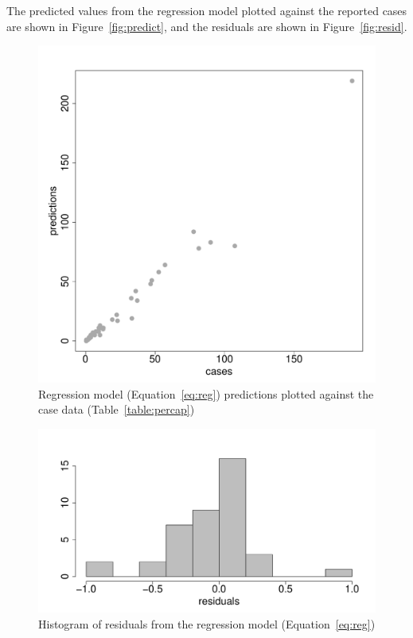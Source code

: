 \documentclass{article}
\begin{document}
The predicted values from the regression model plotted against the reported cases are shown in Figure~\autoref{fig:predict}, and the residuals are shown in Figure~\autoref{fig:resid}.
\begin{figure}
\begin{center}
\includegraphics{draftfinalreport-015}
\end{center}
\caption{Regression model (Equation~\autoref{eq:reg}) predictions plotted against the case data (Table~\autoref{table:percap})}
\label{fig:predict}
\end{figure}


\begin{figure}
\begin{center}
\includegraphics{draftfinalreport-017}
\end{center}
\caption{Histogram of residuals from the regression model (Equation~\autoref{eq:reg})}
\label{fig:resid}
\end{figure}
\end{document}
